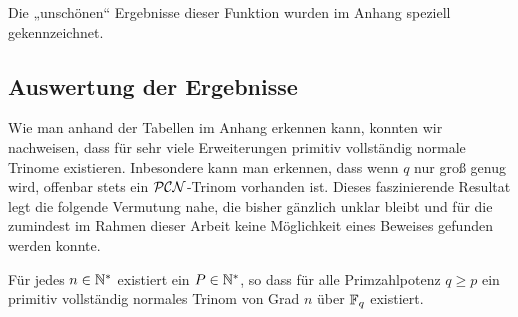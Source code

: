Die „unschönen“ Ergebnisse dieser Funktion wurden im Anhang speziell
gekennzeichnet.


\subsection{Auswertung der Ergebnisse}

Wie man anhand der Tabellen im Anhang erkennen kann, konnten wir nachweisen,
dass für sehr viele Erweiterungen primitiv vollständig normale Trinome
existieren. Inbesondere kann man erkennen, dass wenn $q$ nur groß genug wird,
offenbar stets ein $\mathcal{PCN}$-Trinom vorhanden ist. Dieses faszinierende Resultat 
legt die folgende Vermutung nahe, die bisher gänzlich unklar bleibt und für die 
zumindest im Rahmen dieser Arbeit keine Möglichkeit eines 
Beweises gefunden werden konnte.

\begin{vermutung}
  Für jedes $n\in \mathbb{N}^\ast$ existiert ein $P\in \mathbb{N}^\ast$, so dass für alle
  Primzahlpotenz $q \geq p$ ein primitiv vollständig normales Trinom von Grad
  $n$ über $\mathbb{F}_q$ existiert.
\end{vermutung}
